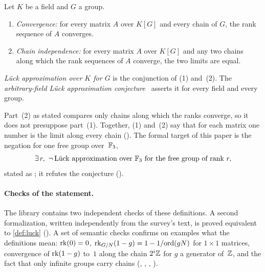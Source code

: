 \begin{definition}\label{def:luck}
Let $K$ be a field and $G$ a group.
\begin{enumerate}[label=(\arabic*)]
\item \emph{Convergence:} for every matrix $A$ over $K[G]$ and every chain of $G$, the rank sequence of $A$ converges.
\item \emph{Chain independence:} for every matrix $A$ over $K[G]$ and any two chains along which the rank sequences of
$A$ converge, the two limits are equal.
\end{enumerate}
\emph{L\"uck approximation over $K$ for $G$} is the conjunction of (1) and~(2). The \emph{arbitrary-field L\"uck
approximation conjecture}~\cite[Conjecture~1.2(1),(2)]{JaikinSurvey2019} asserts it for every field and every group.
\end{definition}

Part~(2) as stated compares only chains along which the ranks converge, so it does not presuppose part~(1). Together, (1)
and~(2) say that for each matrix one number is the limit along every chain (). The
formal target of this paper is the negation for one free group over~$\mathbb{F}_3$,
\[
  \exists\, r,\ \neg\,\text{L\"uck approximation over }\mathbb{F}_3\text{ for the free group of rank }r,
\]
stated as ; it refutes the conjecture ().

\paragraph{Checks of the statement.} The library contains two independent checks of these definitions. A second
formalization, written independently from the survey's text, is proved equivalent to \cref{def:luck}
(). A set of semantic checks confirms on examples what the definitions mean:
$\operatorname{rk}(0)=0$, $\operatorname{rk}_{G/N}(1-g)=1-1/\mathrm{ord}(gN)$ for $1\times1$ matrices, convergence of $\operatorname{rk}(1-g)$ to~$1$ along the
chain $2^i\mathbb{Z}$ for $g$ a generator of~$\mathbb{Z}$, and the fact that only infinite groups carry chains
(, , ,
).
